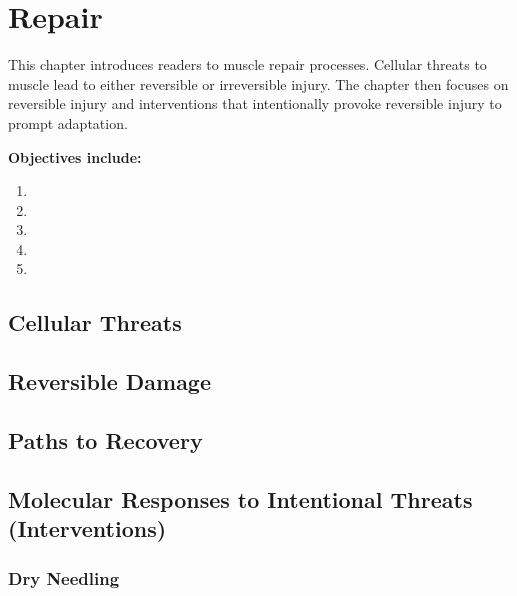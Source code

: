 \chapter{Repair}\label{chp:repair}

\minitoc
This chapter introduces readers to muscle repair processes. Cellular threats to muscle lead to either reversible or irreversible injury. The chapter then focuses on reversible injury and interventions that intentionally provoke reversible injury to prompt adaptation.

\vspace{5mm}

\textbf{Objectives include:}
\begin{enumerate}
    \item
    \item
    \item
    \item
    \item
\end{enumerate}

\section{Cellular Threats}

\section{Reversible Damage}

\section{Paths to Recovery}

\section{Molecular Responses to Intentional Threats (Interventions)}

\subsection{Dry Needling}

\printbibliography[heading=subbibintoc]